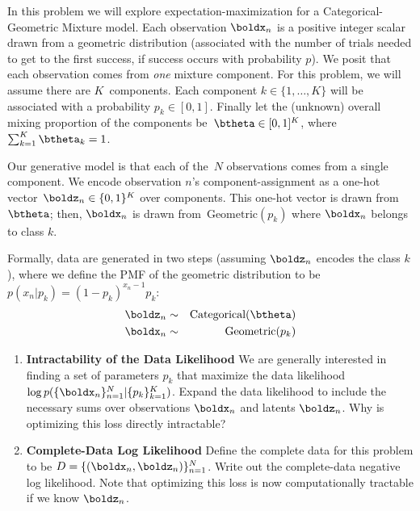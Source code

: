 \documentclass[submit]{harvardml}
\begin{document}
\begin{problem}

In this problem we will explore expectation-maximization for a
Categorical-Geometric Mixture model.  Each observation $\boldx_n$ is a
positive integer scalar drawn from a geometric distribution
(associated with the number of trials needed to get to the first
success, if success occurs with probability $p$).  We posit that each
observation comes from \emph{one} mixture component.  For this
problem, we will assume there are $K$~components. Each component $k
\in \{1, \ldots, K\}$ will be associated with a probability $p_k \in
    [0,1]$.  Finally let the (unknown) overall mixing proportion of
    the components be~$\btheta \in [0,1]^K$, where~${\sum_{k=1}^K
      \btheta_k=1}$.

Our generative model is that each of the~$N$ observations comes from a
single component.  We encode observation $n$'s component-assignment as
a one-hot vector~${\boldz_n \in \{0,1\}^K}$ over components. This
one-hot vector is drawn from~$\btheta$; then, $\boldx_n$ is drawn
from~$\text{Geometric}(p_k )$ where $\boldx_n$ belongs to class $k$.

Formally, data are generated in two steps (assuming $\boldz_n$ encodes
the class $k$), where we define the PMF of the geometric distribution to be $p(x_n | p_k) = (1 - p_k)^{x_n - 1} p_k$:
\begin{eqnarray*}
 \boldz_n &\sim& \text{Categorical}(\btheta) \\
 \boldx_n &\sim& \text{Geometric}(p_k )
\end{eqnarray*}

  \begin{enumerate}

  \item \textbf{Intractability of the Data Likelihood} We are
    generally interested in finding a set of parameters $p_k$ that
    maximize the data likelihood $\log
    p(\{\boldx_n\}^N_{n=1}|\{p_k\}^K_{k = 1})$.  Expand the data
    likelihood to include the necessary sums over observations
    $\boldx_n$ and latents $\boldz_n$.  Why is optimizing this loss
    directly intractable?

\item \textbf{Complete-Data Log Likelihood} Define the complete data
  for this problem to be $D = \{(\boldx_n, \boldz_n)\}_{n=1}^N$. Write
  out the complete-data negative log likelihood. Note that optimizing
  this loss is now computationally tractable if we know $\boldz_n$.


\end{enumerate}
\end{problem}
\end{document}
